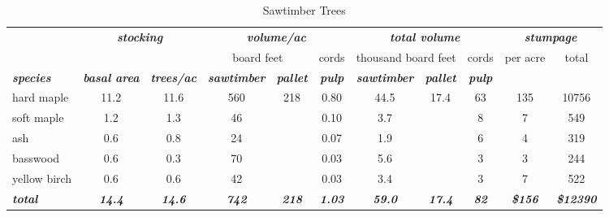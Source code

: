 \documentclass[landscape]{article}
\begin{document}
\begin{table}[H]

\caption{\label{tab:unnamed-chunk-54}Sawtimber Trees}
\fontsize{10}{12}\selectfont
\begin{tabular}[t]{lcccccccccc}
\toprule
\multicolumn{1}{c}{\em{\textbf{ }}} & \multicolumn{2}{c}{\em{\textbf{stocking}}} & \multicolumn{3}{c}{\em{\textbf{volume/ac }}} & \multicolumn{3}{c}{\em{\textbf{total volume}}} & \multicolumn{2}{c}{\em{\textbf{stumpage}}} \\
\cmidrule(l{3pt}r{3pt}){2-3} \cmidrule(l{3pt}r{3pt}){4-6} \cmidrule(l{3pt}r{3pt}){7-9} \cmidrule(l{3pt}r{3pt}){10-11}
\multicolumn{3}{c}{ } & \multicolumn{2}{c}{board feet} & \multicolumn{1}{c}{cords} & \multicolumn{2}{c}{thousand board feet} & \multicolumn{1}{c}{cords} & \multicolumn{1}{c}{per acre} & \multicolumn{1}{c}{total} \\
\cmidrule(l{3pt}r{3pt}){4-5} \cmidrule(l{3pt}r{3pt}){6-6} \cmidrule(l{3pt}r{3pt}){7-8} \cmidrule(l{3pt}r{3pt}){9-9} \cmidrule(l{3pt}r{3pt}){10-10} \cmidrule(l{3pt}r{3pt}){11-11}
\rowcolor[HTML]{DCDCDC}  \em{\textbf{species}} & \em{\textbf{basal area}} & \em{\textbf{trees/ac}} & \em{\textbf{sawtimber}} & \em{\textbf{pallet}} & \em{\textbf{pulp}} & \em{\textbf{sawtimber}} & \em{\textbf{pallet}} & \em{\textbf{pulp}} & \em{\textbf{ }} & \em{\textbf{ }}\\
\midrule
\rowcolor{gray!6}  hard maple & 11.2 & 11.6 & 560 & 218 & 0.80 & 44.5 & 17.4 & 63 & 135 & 10756\\
 
soft maple & 1.2 & 1.3 & 46 &  & 0.10 & 3.7 &  & 8 & 7 & 549\\
 
\rowcolor{gray!6}  ash & 0.6 & 0.8 & 24 &  & 0.07 & 1.9 &  & 6 & 4 & 319\\
 
basswood & 0.6 & 0.3 & 70 &  & 0.03 & 5.6 &  & 3 & 3 & 244\\
 
\rowcolor{gray!6}  yellow birch & 0.6 & 0.6 & 42 &  & 0.03 & 3.4 &  & 3 & 7 & 522\\
 
\rowcolor[HTML]{DCDCDC}  \em{\textbf{total}} & \em{\textbf{14.4}} & \em{\textbf{14.6}} & \em{\textbf{742}} & \em{\textbf{218}} & \em{\textbf{1.03}} & \em{\textbf{59.0}} & \em{\textbf{17.4}} & \em{\textbf{82}} & \em{\textbf{\$156}} & \em{\textbf{\$12390}}\\
\bottomrule
\end{tabular}
\end{table}
\end{document}
